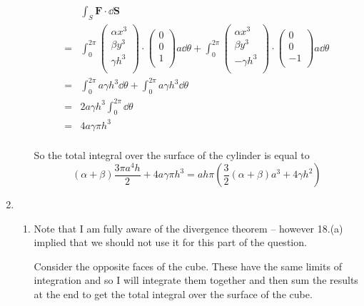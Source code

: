 \documentclass[10pt,\jkfside,a4paper]{article}
\begin{document}
\begin{enumerate}
\begin{enumerate}
\[
\begin{split}
 & \int_S \mathbf{F} \cdot \dd{\mathbf{S}} \\
=& \int^{2\pi}_0 \begin{pmatrix} \alpha x^3 \\ \beta y^3 \\ \gamma h^3 \\ \end{pmatrix} \cdot \begin{pmatrix} 0 \\ 0 \\ 1 \\ \end{pmatrix} a\dd{\theta} + \int^{2\pi}_0 \begin{pmatrix} \alpha x^3 \\ \beta y^3 \\ -\gamma h^3 \\ \end{pmatrix} \cdot \begin{pmatrix} 0 \\ 0 \\ -1 \\ \end{pmatrix} a\dd{\theta} \\
=& \int^{2\pi}_0 a\gamma h^3 \dd{\theta} + \int^{2\pi}_0 a\gamma h^3 \dd{\theta} \\
=& 2a\gamma h^3\int^{2\pi}_0 \dd{\theta} \\
=& 4a\gamma \pi h^3 \\
\end{split}
\]

So the total integral over the surface of the cylinder is equal to
\[(\alpha + \beta)\frac{3\pi a^4h}{2} + 4a\gamma\pi h^3 = ah\pi(\frac{3}{2}(\alpha + \beta)a^3 + 4\gamma h^2)\]

\end{enumerate}

\item
\begin{enumerate}

\item

Note that I am fully aware of the divergence theorem -- however 18.(a) implied that we should 
not use it for this part of the question.

Consider the opposite faces of the cube. These have the same limits of integration and 
so I will integrate them together and then sum the results at the end to get the total 
integral over the surface of the cube.


\end{enumerate}
\end{enumerate}
\end{document}
